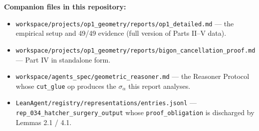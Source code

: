 \documentclass[
]{article}
\providecommand{\tightlist}{%
  \setlength{\itemsep}{0pt}\setlength{\parskip}{0pt}}
\begin{document}
\textbf{Companion files in this repository:}

\begin{itemize}
\tightlist
\item
  \texttt{workspace/projects/op1\_geometry/reports/op1\_detailed.md} ---
  the empirical setup and 49/49 evidence (full version of Parts II--V
  data).
\item
  \texttt{workspace/projects/op1\_geometry/reports/bigon\_cancellation\_proof.md}
  --- Part IV in standalone form.
\item
  \texttt{workspace/agents\_spec/geometric\_reasoner.md} --- the
  Reasoner Protocol whose \texttt{cut\_glue} op produces the
  \(\sigma_\alpha\) this report analyses.
\item
  \texttt{LeanAgent/registry/representations/entries.jsonl} ---
  \texttt{rep\_034\_hatcher\_surgery\_output} whose
  \texttt{proof\_obligation} is discharged by Lemmas 2.1 / 4.1.
\end{itemize}
\end{document}
